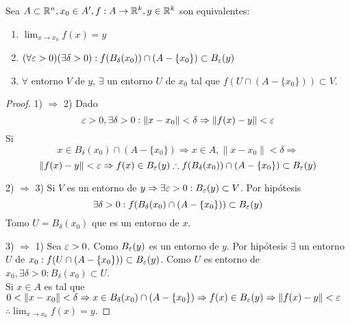 \begin{prop}
  Sea $A \subset \mathbb{R}^n, x_0 \in A^{\prime}, f: A \to \mathbb{R}^k, y \in \mathbb{R}^k$ son equivalentes:
  \begin{enumerate}
    \item $\lim_{x \to x_0} f(x) = y$
    \item $(\forall \varepsilon > 0)(\exists \delta > 0) : f(B_{\delta}(x_0)) \cap (A - \{x_0\}) \subset B_{\varepsilon}(y)$
    \item $\forall$ entorno $V$ de $y$, $\exists$ un entorno $U$ de $x_0$ tal que $f(U \cap (A - \{x_0\})) \subset V$.
  \end{enumerate}

  \begin{proof}
    1) $\Rightarrow$ 2) Dado \begin{equation}
      \varepsilon > 0, \exists \delta > 0 : \|x - x_0 \| < \delta \Rightarrow \|f(x) - y\| < \varepsilon
    \end{equation} Si \begin{equation} x \in B_{\delta}(x_0) \cap (A - \{x_0\}) \Rightarrow x \in A, \|x - x_0\| < \delta \Rightarrow
    \end{equation}
    \begin{equation}
      \|f(x) - y\| < \varepsilon \Rightarrow f(x) \in B_{\varepsilon}(y) \therefore f(B_{\delta}(x_0)) \cap (A - \{x_0\}) \subset B_{\varepsilon}(y)
    \end{equation}

    2) $\Rightarrow$ 3) Si $V$ es un entorno de $y \Rightarrow \exists \varepsilon > 0 : B_{\varepsilon}(y) \subset V$. Por hipótesis \begin{equation}
      \exists \delta > 0 : f(B_{\delta}(x_0) \cap (A - \{x_0\})) \subset B_{\varepsilon}(y)
    \end{equation} Tomo $U = B_{\delta}(x_0)$ que es un entorno de $x$.

    3) $\Rightarrow$ 1) Sea $\varepsilon > 0$. Como $B_{\varepsilon}(y)$ es un entorno de $y$. Por hipótesis $\exists$ un entorno $U$ de $x_0 : f(U \cap (A - \{x_0\})) \subset B_{\varepsilon}(y)$. Como $U$ es entorno de $x_0, \exists \delta > 0 : B_{\delta}(x_0) \subset U$. \\
    Si $x \in A$ es tal que $0 < \|x - x_0\| < \delta \Rightarrow x \in B_{\delta}(x_0) \cap (A - \{x_0\}) \Rightarrow f(x) \in B_{\varepsilon}(y) \Rightarrow \|f(x) - y\| < \varepsilon$ \\
    $\therefore \lim_{x \to x_0} f(x) = y$.
  \end{proof}
\end{prop}

